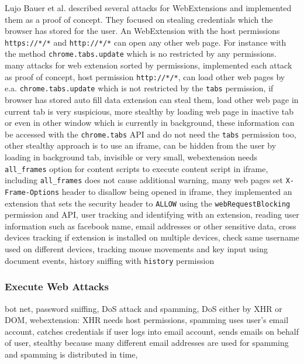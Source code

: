 	Lujo Bauer et al. described several attacks for WebExtensions and implemented them as a proof of concept. They focused on stealing credentials which the browser has stored for the user. An WebExtension with the host permissions \texttt{https://*/*} and \texttt{http://*/*} can open any other web page. For instance with the method \texttt{chrome.tabs.update} which is no restricted by any permissions. \\
	
	\cite{extensions:cns14} many attacks for web extension sorted by permissions, implemented each attack as proof of concept, host permission \texttt{http://*/*}, can load other web pages by e.a. \texttt{chrome.tabs.update} which is not restricted by the \texttt{tabs} permission, if browser has stored auto fill data extension can steal them, load other web page in current tab is very suspicious, more stealthy by loading web page in inactive tab or even in other window which is currently in background, these information can be accessed with the \texttt{chrome.tabs} API and do not need the \texttt{tabs} permission too, other stealthy approach is to use an iframe, can be hidden from the user by loading in background tab, invisible or very small, webextension needs \texttt{all\_frames} option for content scripts to execute content script in iframe, including \texttt{all\_frames} does not cause additional warning, many web pages set \texttt{X-Frame-Options} header to disallow being opened in iframe, they implemented an extension that sets the security header to \texttt{ALLOW} using the \texttt{webRequestBlocking} permission and API, user tracking and identifying with an extension, reading user information such as facebook name, email addresses or other sensitive data, cross devices tracking if extension is installed on multiple devices, check same username used on different devices, tracking mouse movements and key input using document events, history sniffing with \texttt{history} permission \\


	
\subsubsection{Execute Web Attacks}
	
	\cite{liu2011botnet, Liu12chromeextensions:} bot net, password sniffing, DoS attack and spamming, DoS either by XHR or DOM, webextension: XHR needs host permissions, spamming uses user's email account, catches credentials if user logs into email account, sends emails on behalf of user, stealthy because many different email addresses are used for spamming and spamming is distributed in time, \\
	
